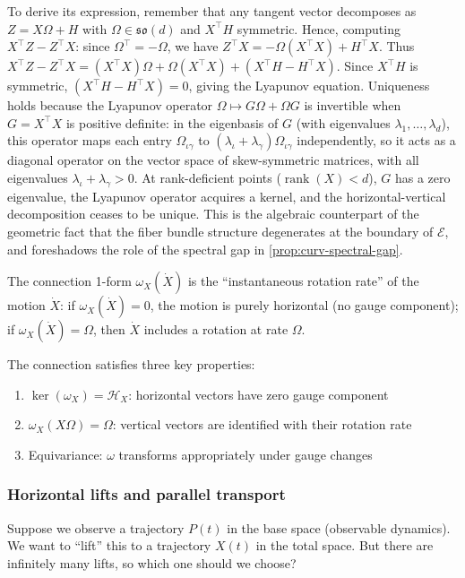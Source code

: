 \documentclass{article}
\newcommand{\so}{\mathfrak{so}}
\DeclareMathOperator{\rank}{rank}
\theoremstyle{plain}
\theoremstyle{definition}
\theoremstyle{remark}
\begin{document}
To derive its expression, remember that any tangent vector decomposes as $Z = X\Omega + H$ with $\Omega \in \so(d)$ and $X^\top H$ symmetric.
Hence, computing $X^\top Z - Z^\top X$: since $\Omega^\top = -\Omega$, we have $Z^\top X = -\Omega (X^\top X) + H^\top X$.
Thus $X^\top Z - Z^\top X = (X^\top X) \Omega + \Omega (X^\top X) + (X^\top H - H^\top X)$.
Since $X^\top H$ is symmetric, $(X^\top H - H^\top X) = 0$, giving the Lyapunov equation.
Uniqueness holds because the Lyapunov operator $\Omega \mapsto G\Omega + \Omega G$ is invertible when $G = X^\top X$ is positive definite: in the eigenbasis of $G$ (with eigenvalues $\lambda_1, \ldots, \lambda_d$), this operator maps each entry $\Omega_{\iota\gamma}$ to $(\lambda_\iota + \lambda_\gamma) \Omega_{\iota\gamma}$ independently, so it acts as a diagonal operator on the vector space of skew-symmetric matrices, with all eigenvalues $\lambda_\iota + \lambda_\gamma > 0$.
At rank-deficient points ($\rank(X) < d$), $G$ has a zero eigenvalue, the Lyapunov operator acquires a kernel, and the horizontal-vertical decomposition ceases to be unique.
This is the algebraic counterpart of the geometric fact that the fiber bundle structure degenerates at the boundary of $\mathcal{E}$, and foreshadows the role of the spectral gap in \cref{prop:curv-spectral-gap}.

The connection 1-form $\omega_X(\dot{X})$ is the ``instantaneous rotation rate'' of the motion $\dot{X}$: if $\omega_X(\dot{X}) = 0$, the motion is purely horizontal (no gauge component); if $\omega_X(\dot{X}) = \Omega$, then $\dot{X}$ includes a rotation at rate $\Omega$.

The connection satisfies three key properties:
\begin{enumerate}
\item $\ker(\omega_X) = \mathcal{H}_X$: horizontal vectors have zero gauge component
\item $\omega_X(X\Omega) = \Omega$: vertical vectors are identified with their rotation rate
\item Equivariance: $\omega$ transforms appropriately under gauge changes
\end{enumerate}

\subsubsection{Horizontal lifts and parallel transport}

Suppose we observe a trajectory $P(t)$ in the base space (observable dynamics).
We want to ``lift'' this to a trajectory $X(t)$ in the total space.
But there are infinitely many lifts, so which one should we choose?
\end{document}
